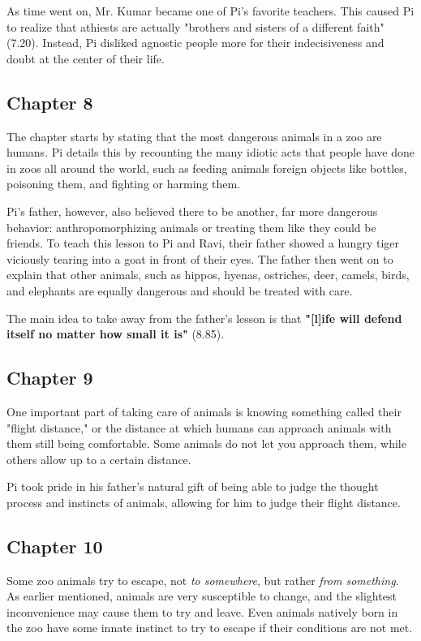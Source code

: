 \documentclass[11pt]{article}
\begin{document}
As time went on, Mr. Kumar became one of Pi's favorite teachers. This caused Pi to realize that athiests are actually "brothers and sisters of a different faith" (7.20). Instead, Pi disliked agnostic people more for their indecisiveness and doubt at the center of their life.
\subsection{Chapter 8}
\label{sec:org1dc1cd5}
The chapter starts by stating that the most dangerous animals in a zoo are humans. Pi details this by recounting the many idiotic acts that people have done in zoos all around the world, such as feeding animals foreign objects like bottles, poisoning them, and fighting or harming them.

Pi's father, however, also believed there to be another, far more dangerous behavior: anthropomorphizing animals or treating them like they could be friends. To teach this lesson to Pi and Ravi, their father showed a hungry tiger viciously tearing into a goat in front of their eyes. The father then went on to explain that other animals, such as hippos, hyenas, ostriches, deer, camels, birds, and elephants are equally dangerous and should be treated with care.

The main idea to take away from the father's lesson is that \textbf{"[l]ife will defend itself no matter how small it is"} (8.85).
\subsection{Chapter 9}
\label{sec:org4c14d90}
One important part of taking care of animals is knowing something called their "flight distance," or the distance at which humans can approach animals with them still being comfortable. Some animals do not let you approach them, while others allow up to a certain distance.

Pi took pride in his father's natural gift of being able to judge the thought process and instincts of animals, allowing for him to judge their flight distance.
\subsection{Chapter 10}
\label{sec:org936ebc1}
Some zoo animals try to escape, not \emph{to somewhere}, but rather \emph{from something}. As earlier mentioned, animals are very susceptible to change, and the slightest inconvenience may cause them to try and leave. Even animals natively born in the zoo have some innate instinct to try to escape if their conditions are not met.
\end{document}
